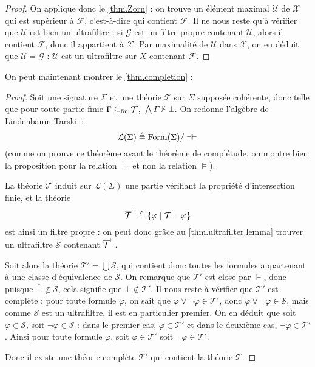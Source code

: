 \begin{proof}
  On applique donc le \cref{thm.Zorn} : on trouve un élément maximal
  $\mathcal U$ de $\mathcal X$ qui est supérieur à $\mathcal F$, c'est-à-dire
  qui contient $\mathcal F$. Il ne nous reste qu'à vérifier que $\mathcal U$ est
  bien un ultrafiltre : si $\mathcal G$ est un filtre propre contenant
  $\mathcal U$, alors il contient $\mathcal F$, donc il appartient à
  $\mathcal X$. Par maximalité de $\mathcal U$ dans $\mathcal X$, on en déduit
  que $\mathcal U = \mathcal G$ : $\mathcal U$ est un ultrafiltre sur $X$
  contenant $\mathcal F$.
\end{proof}

On peut maintenant montrer le \cref{thm.completion} :

\begin{proof}
  Soit une signature $\Sigma$ et une théorie $\mathcal T$ sur $\Sigma$ supposée
  cohérente, donc telle que pour toute partie finie $\Gamma\subseteq_{\mathrm{fin}} \mathcal T$,
  $\bigwedge \Gamma \nvdash \bot$. On redonne l'algèbre de Lindenbaum-Tarski~:
  \[\mathcal L(\Sigma) \triangleq \operatorname{Form}(\Sigma)/\dashv\vdash\]
  (comme on prouve ce théorème avant le théorème de complétude, on montre bien
  la proposition pour la relation $\vdash$ et non la relation $\vDash$).

  La théorie $\mathcal T$ induit sur $\mathcal L(\Sigma)$ une partie vérifiant
  la propriété d'intersection finie, et la théorie
  \[\overline{\mathcal T}^{\vdash} \triangleq \{\varphi\mid \mathcal T \vdash \varphi\}\]
  est ainsi un filtre propre : on peut donc grâce au
  \cref{thm.ultrafilter.lemma} trouver un ultrafiltre $\mathcal S$ contenant
  $\overline{\mathcal T}^{\vdash}$.

  Soit alors la théorie $\mathcal T' = \bigcup\mathcal S$, qui contient donc
  toutes les formules appartenant à une classe d'équivalence de $\mathcal S$.
  On remarque que $\mathcal T'$ est close par $\vdash$, donc puisque
  $\overline\bot \notin\mathcal S$, cela signifie que $\bot\notin\mathcal T'$.
  Il nous reste à vérifier que $\mathcal T'$ est complète : pour toute
  formule $\varphi$, on sait que $\varphi\lor\lnot\varphi \in \mathcal T'$, donc
  $\overline{\varphi}\lor\overline{\lnot\varphi}\in\mathcal S$, mais
  comme $\mathcal S$ est un ultrafiltre, il est en particulier premier. On
  en déduit que soit $\overline\varphi \in \mathcal S$, soit
  $\overline{\lnot\varphi}\in \mathcal S$ : dans le premier cas,
  $\varphi\in \mathcal T'$ et dans le deuxième cas,
  $\lnot\varphi\in \mathcal T'$. Ainsi pour toute formule $\varphi$, soit
  $\varphi\in \mathcal T'$ soit $\lnot\varphi\in \mathcal T'$.

  Donc il existe une théorie complète $\mathcal T'$ qui contient la théorie
  $\mathcal T$.
\end{proof}

